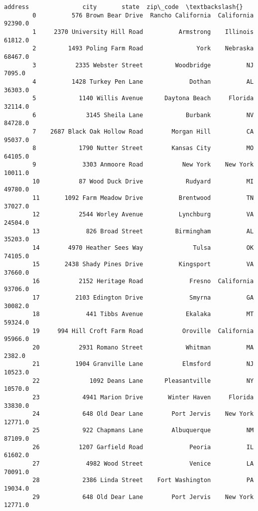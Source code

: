 \documentclass[11pt]{article}
\begin{document}
\begin{Verbatim}[commandchars=\\\{\}]
                                address               city       state  zip\_code  \textbackslash{}
        0          576 Brown Bear Drive  Rancho California  California   92390.0   
        1     2370 University Hill Road          Armstrong    Illinois   61812.0   
        2         1493 Poling Farm Road               York    Nebraska   68467.0   
        3           2335 Webster Street         Woodbridge          NJ    7095.0   
        4          1428 Turkey Pen Lane             Dothan          AL   36303.0   
        5            1140 Willis Avenue      Daytona Beach     Florida   32114.0   
        6              3145 Sheila Lane            Burbank          NV   84728.0   
        7    2687 Black Oak Hollow Road        Morgan Hill          CA   95037.0   
        8            1790 Nutter Street        Kansas City          MO   64105.0   
        9             3303 Anmoore Road           New York    New York   10011.0   
        10           87 Wood Duck Drive            Rudyard          MI   49780.0   
        11       1092 Farm Meadow Drive          Brentwood          TN   37027.0   
        12           2544 Worley Avenue          Lynchburg          VA   24504.0   
        13             826 Broad Street         Birmingham          AL   35203.0   
        14        4970 Heather Sees Way              Tulsa          OK   74105.0   
        15       2438 Shady Pines Drive          Kingsport          VA   37660.0   
        16           2152 Heritage Road             Fresno  California   93706.0   
        17          2103 Edington Drive             Smyrna          GA   30082.0   
        18             441 Tibbs Avenue            Ekalaka          MT   59324.0   
        19     994 Hill Croft Farm Road           Oroville  California   95966.0   
        20           2931 Romano Street            Whitman          MA    2382.0   
        21          1904 Granville Lane           Elmsford          NJ   10523.0   
        22              1092 Deans Lane      Pleasantville          NY   10570.0   
        23            4941 Marion Drive       Winter Haven     Florida   33830.0   
        24            648 Old Dear Lane        Port Jervis    New York   12771.0   
        25            922 Chapmans Lane        Albuquerque          NM   87109.0   
        26           1207 Garfield Road             Peoria          IL   61602.0   
        27             4982 Wood Street             Venice          LA   70091.0   
        28            2386 Linda Street    Fort Washington          PA   19034.0   
        29            648 Old Dear Lane        Port Jervis    New York   12771.0   

\end{Verbatim}
\end{document}

